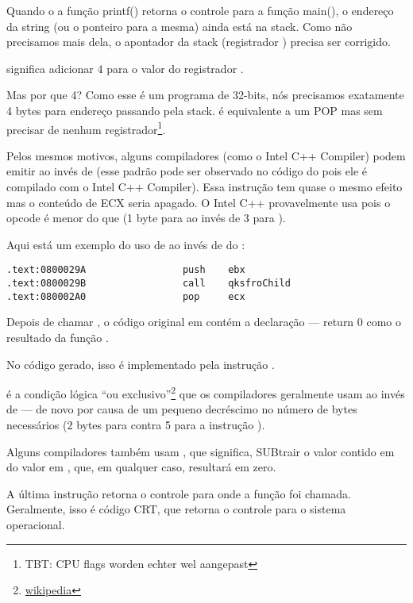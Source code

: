 Quando o a função printf() retorna o controle para a função main(), o endereço da string (ou o ponteiro para a mesma) ainda está na stack.
Como não precisamos mais dela, o apontador da stack (registrador \ESP) precisa ser corrigido.

 significa adicionar 4 para o valor do registrador \ESP.

Mas por que 4? Como esse é um programa de 32-bits, nós precisamos exatamente 4 bytes para endereço passando pela stack.
 é equivalente a um POP mas sem precisar de nenhum registrador\footnote{\ac{TBT}: CPU flags worden echter wel aangepast}.

\myindex{\oracle}

Pelos mesmos motivos, alguns compiladores (como o Intel C++ Compiler) podem emitir  ao invés de \ADD (esse padrão pode ser observado no código do \oracle{} pois ele é compilado com o Intel C++ Compiler).
Essa instrução tem quase o mesmo efeito mas o conteúdo de ECX seria apagado.
O Intel C++ provavelmente usa  pois o opcode é menor do que  (1 byte para \POP ao invés de 3 para \ADD).

Aqui está um exemplo do uso de \POP ao invés de \ADD do \oracle{}:

\begin{lstlisting}[caption=\oracle 10.2 Linux (app.o file)]
.text:0800029A                 push    ebx
.text:0800029B                 call    qksfroChild
.text:080002A0                 pop     ecx
\end{lstlisting}

Depois de chamar \printf{}, o código original em \CCpp contém a declaração  --- return 0 como o resultado da função \main{}.

No código gerado, isso é implementado pela instrução .


\XOR é a condição lógica ``ou exclusivo''\footnote{\href{http://go.yurichev.com/17118}{wikipedia}} que os compiladores geralmente usam ao invés de 
 --- de novo por causa de um pequeno decréscimo no número de bytes necessários (2 bytes para \XOR contra 5 para a instrução \MOV).

Alguns compiladores também usam , que significa, SUBtrair o valor contido em \EAX do valor em \EAX, que, em qualquer caso, resultará em zero.

A última instrução \RET retorna o controle para onde a função foi chamada. Geralmente, isso é código \CCpp \ac{CRT}, que retorna o controle para o sistema operacional.

